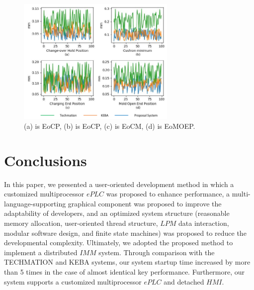 \documentclass[journal,UTF8]{IEEEtran}
\begin{document}
\begin{figure}
	\centering
	\includegraphics[width=3in]{fig/Compare.pdf}
	\caption{(a) is EoCP, (b) is EoCP, (c) is EoCM, (d) is EoMOEP.}
	\label{fig:Compare}
\end{figure}
\section{Conclusions}
\label{conclusion}
In this paper, we presented a user-oriented development method in which a customized multiprocessor $ePLC$ was proposed to enhance performance, a multi-language-supporting graphical component was proposed to improve the adaptability of developers, and an optimized system structure (reasonable memory allocation, user-oriented thread structure, $LPM$ data interaction, modular software design, and finite state machines) was proposed to reduce the developmental complexity. Ultimately, we adopted the proposed method to implement a distributed $IMM$ system. Through comparison with the TECHMATION and KEBA systems, our system startup time increased by more than 5 times in the case of almost identical key performance. Furthermore, our system supports a customized multiprocessor $ePLC$ and detached $HMI$.





\ifCLASSOPTIONcaptionsoff
  \newpage
\fi





%
%
%
\end{document}
